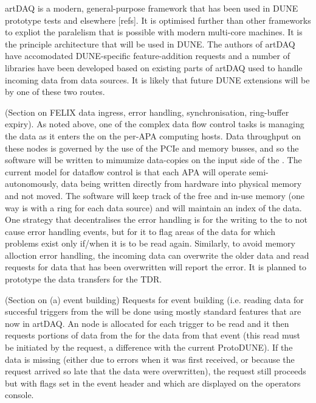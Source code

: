 artDAQ is a modern, general-purpose framework that has been used in
DUNE prototype tests and elsewhere [refs]. 
It is optimised further than other frameworks to expliot the
paralelism that is possible with modern multi-core machines. 
It is the principle architecture that will be used in DUNE.
The authors of artDAQ have accomodated DUNE-specific feature-addition
requests and a number of libraries have been developed based on
existing parts of artDAQ used to handle incoming data from data
sources. 
It is likely that future DUNE extensions will be by one of these two
routes.

(Section on FELIX data ingress, error handling, synchronisation,
ring-buffer expiry). 
As noted above, one of the complex data flow control tasks is managing
the data as it enters the  on the per-APA 
computing hosts. 
Data throughput on these nodes is governed by the use of the PCIe and
memory busses, and so the software will be written to mimumize
data-copies on the input side of the .
The current model for dataflow control is that each APA will operate
semi-autonomously, data being written directly from hardware into physical
memory and not moved. 
The software will keep track of the free and in-use memory (one way is
with a ring for each data source) and will maintain an index of the
data. 
One strategy that decentralises the error handling is for the writing
to the  to not cause error handling events, but
for it to flag areas of the data for which problems exist only if/when
it is to be read again. 
Similarly, to avoid memory alloction error handling, the incoming data
can overwrite the older data and read requests for data that has been
overwritten will report the error. 
It is planned to prototype the data transfers for the TDR.

(Section on (a) event building) Requests for event building
(i.e. reading data for succesful triggers from the 
will be done using mostly standard features that are now in artDAQ. 
An  node is allocated for each trigger to be read and it
then requests portions of data from the  for the
data from that event (this read must be initiated by the request, a
difference with the current ProtoDUNE).
If the data is missing (either due to errors when it was first
received, or because the request arrived so late that the data were
overwritten), the request still proceeds but with flags set in the event
header and which are displayed on the operators console.

